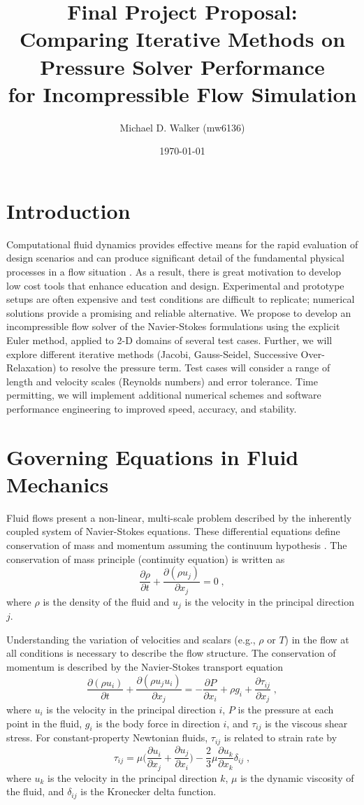 \documentclass{homework}
\author{Michael D. Walker (mw6136)}
\date{\today}
\title{Final Project Proposal: \\ Comparing Iterative Methods on Pressure Solver Performance \\ for Incompressible Flow Simulation}
\begin{document}
 \maketitle

\section{Introduction}
\noindent Computational fluid dynamics provides effective means for the rapid evaluation of design scenarios and can produce significant detail of the fundamental physical processes in a flow situation \cite{Launder1974,Saad2011}. As a result, there is great motivation to develop low cost tools that enhance education and design. Experimental and prototype setups are often expensive and test conditions are difficult to replicate; numerical solutions provide a promising and reliable alternative. We propose to develop an incompressible flow solver of the Navier-Stokes formulations using the explicit Euler method, applied to 2-D domains of several test cases. Further, we will explore different iterative methods (Jacobi, Gauss-Seidel, Successive Over-Relaxation) to resolve the pressure term. Test cases will consider a range of length and velocity scales (Reynolds numbers) and error tolerance. Time permitting, we will implement additional numerical schemes and software performance engineering to improved speed, accuracy, and stability.

\section{\textbf{Governing Equations in Fluid Mechanics}} 
\noindent Fluid flows present a non-linear, multi-scale problem described by the inherently coupled system of Navier-Stokes equations. These differential equations define conservation of mass and momentum assuming the continuum hypothesis \cite{Cant2007}. The conservation of mass principle (continuity equation) is written as
\[ \frac{\partial \rho}{\partial t} + \frac{\partial (\rho u_j)}{\partial x_j} = 0 \; , \]
\noindent
where $\rho$ is the density of the fluid and $u_j$ is the velocity in the principal direction $j$.

Understanding the variation of velocities and scalars (e.g., $\rho$ or $T$) in the flow at all conditions is necessary to describe the flow structure. The conservation of momentum is described by the Navier-Stokes transport equation
\[ \frac{\partial (\rho u_i)}{\partial t} + \frac{\partial (\rho u_j u_i)}{\partial x_j} = -\frac{\partial P}{\partial x_i} + \rho g_i + \frac{\partial \tau_{ij}}{\partial x_j} \; , \]
\noindent
where $u_i$ is the velocity in the principal direction $i$, $P$ is the pressure at each point in the fluid, $g_i$ is the body force in direction $i$, and $\tau_{ij}$ is the viscous shear stress. For constant-property Newtonian fluids, $\tau_{ij}$ is related to strain rate by
\[ \tau_{ij} = \mu \Big(\frac{\partial  u_i}{\partial x_j} + \frac{\partial u_j}{\partial x_i}\Big) - \frac{2}{3} \mu \frac{\partial u_k}{\partial x_k} \delta_{ij} \; , \]
\noindent
where $u_k$ is the velocity in the principal direction $k$, $\mu$ is the dynamic viscosity of the fluid, and $\delta_{ij}$ is the Kronecker delta function.
\end{document}
